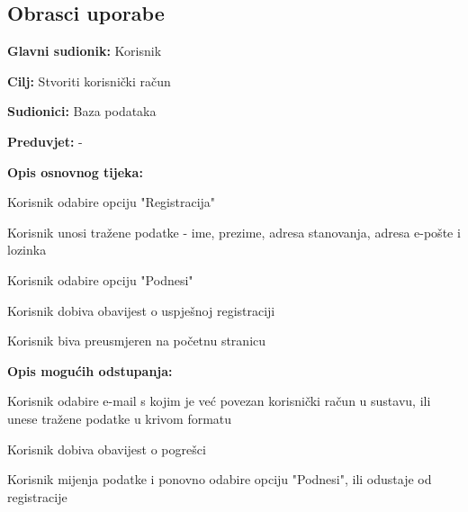 			\eject 
			
			
				
			\subsection{Obrasci uporabe}
					
					\noindent {}
					\begin{packed_item}
	
						\item \textbf{Glavni sudionik: }Korisnik
						\item  \textbf{Cilj:} Stvoriti korisnički račun
						\item  \textbf{Sudionici:} Baza podataka
						\item  \textbf{Preduvjet:} -
						\item  \textbf{Opis osnovnog tijeka:}
						
						\item[] \begin{packed_enum}
	
							\item Korisnik odabire opciju "Registracija"
							\item Korisnik unosi tražene podatke - ime, prezime, adresa stanovanja, adresa e-pošte i lozinka
							\item Korisnik odabire opciju "Podnesi"
							\item Korisnik dobiva obavijest o uspješnoj registraciji
							\item Korisnik biva preusmjeren na početnu stranicu
						\end{packed_enum}
						
						\item  \textbf{Opis mogućih odstupanja:}
						
						\item[] \begin{packed_item}
	
							\item[3.a] Korisnik odabire e-mail s kojim je već povezan korisnički račun u sustavu, ili unese tražene podatke u krivom formatu
							\item[] \begin{packed_enum}
								
								\item Korisnik dobiva obavijest o pogrešci
								\item Korisnik mijenja podatke i ponovno odabire opciju "Podnesi", ili odustaje od registracije
								
							\end{packed_enum}
							
						\end{packed_item}
					\end{packed_item}
					
